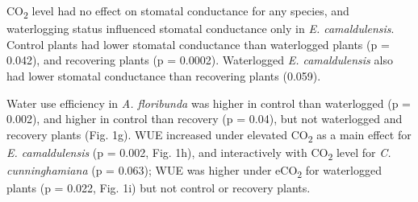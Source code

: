 \documentclass[12pt,a4paper]{memoir}
\begin{document}
CO\textsubscript{2} level had no effect on stomatal conductance for any species, and waterlogging status influenced stomatal conductance only in \textit{E. camaldulensis}. Control plants had lower stomatal conductance than waterlogged plants (p = 0.042), and recovering plants (p = 0.0002). Waterlogged \textit{E. camaldulensis} also had lower stomatal conductance than recovering plants (0.059).

Water use efficiency in \textit{A. floribunda} was higher in control than waterlogged (p = 0.002), and higher in control than recovery (p = 0.04), but not waterlogged and recovery plants (Fig. 1g). WUE increased under elevated CO\textsubscript{2} as a main effect for \textit{E. camaldulensis} (p = 0.002, Fig. 1h), and interactively with CO\textsubscript{2} level for \textit{C. cunninghamiana} (p = 0.063); WUE was higher under eCO\textsubscript{2} for waterlogged plants (p = 0.022, Fig. 1i) but not control or recovery plants.
\end{document}
